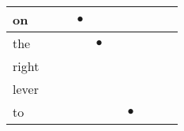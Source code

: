 \documentclass[landscape]{article}
\newcommand{\ssp}{\hspace{2pt}}
\newcommand{\mex}{\cellcolor{g}$\bullet$}
\begin{document}
\begin{tabular}{|l|p{10pt}|p{10pt}|p{10pt}|p{10pt}|p{10pt}|p{10pt}|p{10pt}|p{10pt}|p{10pt}|}
\hline
\ssp \cellcolor{ref2}on \ssp&\hspace{2pt}&\hspace{2pt}&\hspace{2pt}\mex&\hspace{2pt}&\hspace{2pt}&\hspace{2pt}&\hspace{2pt}&\hspace{2pt}&\hspace{2pt}\\
\hline
\ssp \cellcolor{ref3}the \ssp&\hspace{2pt}&\hspace{2pt}&\hspace{2pt}&\hspace{2pt}\mex&\hspace{2pt}&\hspace{2pt}&\hspace{2pt}&\hspace{2pt}&\hspace{2pt}\\
\hline
\ssp right \ssp&\hspace{2pt}&\hspace{2pt}&\hspace{2pt}&\hspace{2pt}&\hspace{2pt}&\hspace{2pt}&\hspace{2pt}&\hspace{2pt}&\hspace{2pt}\\
\hline
\ssp lever \ssp&\hspace{2pt}&\hspace{2pt}&\hspace{2pt}&\hspace{2pt}&\hspace{2pt}&\hspace{2pt}&\hspace{2pt}&\hspace{2pt}&\hspace{2pt}\\
\hline
\ssp \cellcolor{ref5}to \ssp&\hspace{2pt}&\hspace{2pt}&\hspace{2pt}&\hspace{2pt}&\hspace{2pt}&\hspace{2pt}\mex&\hspace{2pt}&\hspace{2pt}&\hspace{2pt}\\

\end{tabular}
\end{document}
